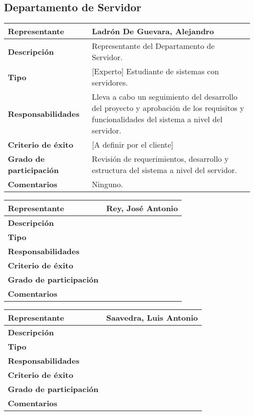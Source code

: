     \subsection{Departamento de Servidor}
        \begin{tabular}{|p{4cm}|p{12cm}|}
            \hline \textbf{Representante} &  Ladrón De Guevara, Alejandro\\
            \hline \textbf{Descripción} & Representante del Departamento de Servidor. \\
            \hline \textbf{Tipo} &  [Experto] Estudiante de sistemas con servidores. \\
            \hline \textbf{Responsabilidades} & Lleva a cabo un seguimiento del desarrollo del proyecto y aprobación de  los requisitos y funcionalidades del sistema a nivel del servidor. \\
            \hline \textbf{Criterio de éxito} & [A definir por el cliente] \\
            \hline \textbf{Grado de participación} & Revisión de requerimientos, desarrollo y estructura del sistema a nivel del servidor. \\
            \hline \textbf{Comentarios} &  Ninguno. \\
            \hline
        \end{tabular}

        \begin{tabular}{|p{4cm}|p{12cm}|}
            \hline \textbf{Representante} & Rey, José Antonio \\
            \hline \textbf{Descripción} &  \\
            \hline \textbf{Tipo} &  \\
            \hline \textbf{Responsabilidades} &  \\
            \hline \textbf{Criterio de éxito} &  \\
            \hline \textbf{Grado de participación} &  \\
            \hline \textbf{Comentarios} &  \\
            \hline
        \end{tabular}

        \begin{tabular}{|p{4cm}|p{12cm}|}
            \hline \textbf{Representante} & Saavedra, Luis Antonio \\
            \hline \textbf{Descripción} &  \\
            \hline \textbf{Tipo} &  \\
            \hline \textbf{Responsabilidades} &  \\
            \hline \textbf{Criterio de éxito} &  \\
            \hline \textbf{Grado de participación} &  \\
            \hline \textbf{Comentarios} &  \\
            \hline
        \end{tabular}


